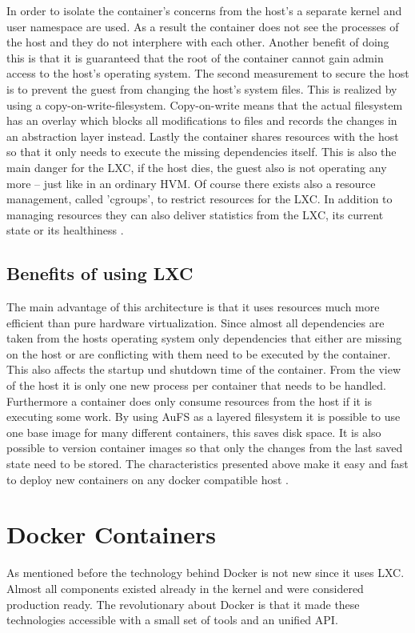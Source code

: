 \documentclass[conference]{IEEEtran}
\begin{document}
In order to isolate the container's concerns from the host's a separate kernel and user namespace are used. As a result the container does not see the processes of the host and they do not interphere with each other. Another benefit of doing this is that it is guaranteed that the root of the container cannot gain admin access to the host's operating system. The second measurement to secure the host is to prevent the guest from changing the host's system files. This is realized by using a copy-on-write-filesystem. Copy-on-write means that the actual filesystem has an overlay which blocks all modifications to files and records the changes in an abstraction layer instead. Lastly the container shares resources with the host so that it only needs to execute the missing dependencies itself. This is also the main danger for the LXC, if the host dies, the guest also is not operating any more – just like in an ordinary HVM. Of course there exists also a resource management, called 'cgroups', to restrict resources for the LXC. In addition to managing resources they can also deliver statistics from the LXC, its current state or its healthiness \cite{Merkel2014}.\\

\subsection{Benefits of using LXC}
The main advantage of this architecture is that it uses resources much more efficient than pure hardware virtualization. Since almost all dependencies are taken from the hosts operating system only dependencies that either are missing on the host or are conflicting with them need to be executed by the container. This also affects the startup und shutdown time of the container. From the view of the host it is only one new process per container that needs to be handled. Furthermore a container does only consume resources from the host if it is executing some work. By using AuFS as a layered filesystem it is possible to use one base image for many different containers, this saves disk space. It is also possible to version container images so that only the changes from the last saved state need to be stored. The characteristics presented above make it easy and fast to deploy new containers on any docker compatible host \cite{Merkel2014}.

\section{Docker Containers}
As mentioned before the technology behind Docker is not new since it uses LXC. Almost all components existed already in the kernel and were considered production ready. The revolutionary about Docker is that it made these technologies accessible with a small set of tools and an unified API.
\end{document}
